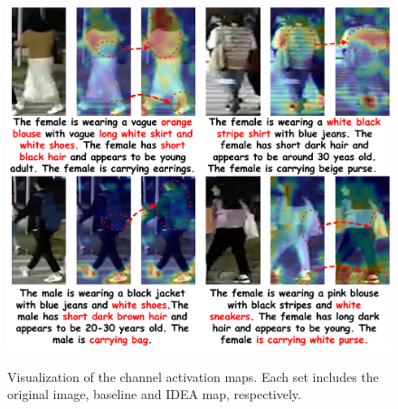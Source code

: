 \begin{figure}[t]
  \centering
    \resizebox{0.45\textwidth}{!}
    {
  \includegraphics[width=30\linewidth]{sec/img/ChannelAct.pdf}
  }
  \vspace{-1mm}
   \caption{Visualization of the channel activation maps.
   Each set includes the original image, baseline and IDEA map, respectively.}
  \label{fig:text_gain}
  \vspace{-5mm}
\end{figure}
